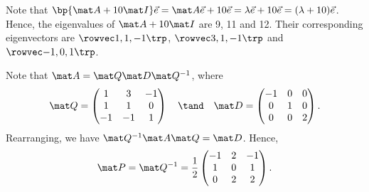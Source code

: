 \begin{solution}
    \begin{ppart}
        Note that $\bp{\mat A + 10\mat I} \vec e = \mat A \vec e + 10 \vec e = \l \vec e + 10 \vec e = (\l + 10) \vec e$. Hence, the eigenvalues of $\mat A + 10\mat I$ are 9, 11 and 12. Their corresponding eigenvectors are $\cveciiix11{-1}$, $\cveciiix31{-1}$ and $\cveciiix{-1}01$.
    \end{ppart}
    \begin{ppart}
        Note that $\mat A = \mat Q \mat D \mat Q^{-1}$, where \[\mat Q = \begin{pmatrix}1 & 3 & -1 \\ 1 & 1 & 0 \\ -1 & -1 & 1\end{pmatrix} \quad \tand \quad \mat D = \begin{pmatrix}-1 & 0 & 0 \\ 0 & 1 & 0 \\ 0 & 0 & 2\end{pmatrix}.\] Rearranging, we have $\mat Q^{-1} \mat A \mat Q = \mat D$. Hence, \[\mat P = \mat Q^{-1} = \frac12 \begin{pmatrix}-1 & 2 & -1 \\ 1 & 0 & 1 \\ 0 & 2 & 2\end{pmatrix}.\]
    \end{ppart}
\end{solution}

